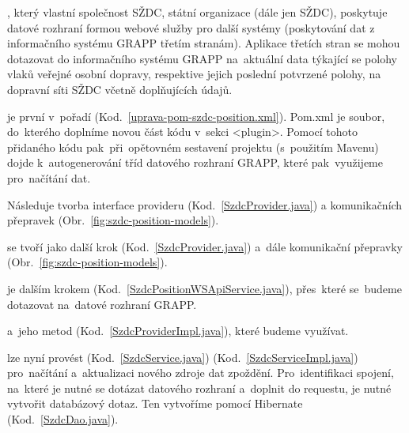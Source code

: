

, který vlastní společnost SŽDC, státní organizace (dále jen SŽDC), poskytuje datové rozhraní formou webové služby pro další systémy (poskytování dat z informačního systému GRAPP třetím stranám). Aplikace třetích stran se mohou dotazovat do informačního systému GRAPP na~aktuální data týkající se polohy vlaků veřejné osobní dopravy, respektive jejich poslední potvrzené polohy, na dopravní síti SŽDC včetně doplňujících údajů.

je první v~pořadí (Kod.~\ref{uprava-pom-szdc-position.xml}). Pom.xml je soubor, do~kterého doplníme novou část kódu v~sekci <plugin>. Pomocí tohoto přidaného kódu pak~při~opětovném sestavení projektu (s~použitím Mavenu) dojde k~autogenerování tříd datového rozhraní GRAPP, které pak~využijeme pro~načítání dat.

Následuje tvorba interface provideru (Kod.~\ref{SzdcProvider.java}) a komunikačních přepravek (Obr.~\ref{fig:szdc-position-models}).

 se tvoří jako další krok (Kod.~\ref{SzdcProvider.java}) a~dále komunikační přepravky (Obr.~\ref{fig:szdc-position-models}).
 	

 je dalším krokem (Kod.~\ref{SzdcPositionWSApiService.java}), přes~které se~budeme dotazovat na~datové rozhraní GRAPP.


 a~jeho metod (Kod.~\ref{SzdcProviderImpl.java}), které budeme využívat.


 lze nyní provést (Kod.~\ref{SzdcService.java}) (Kod.~\ref{SzdcServiceImpl.java}) pro~načítání a~aktualizaci nového zdroje dat zpoždění. Pro~identifikaci spojení, na~které je nutné se dotázat datového rozhraní a~doplnit do requestu, je nutné vytvořit databázový dotaz. Ten vytvoříme pomocí Hibernate (Kod.~\ref{SzdcDao.java}).


